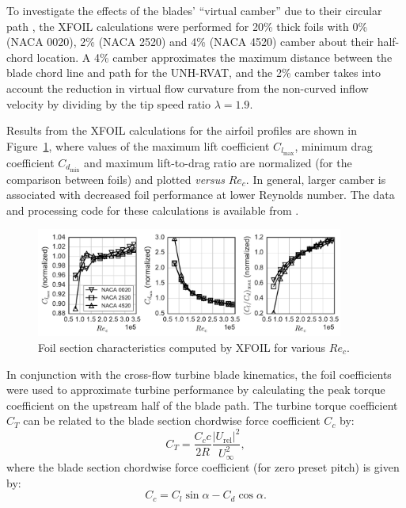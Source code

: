 \documentclass[energies,article,accept,moreauthors,pdftex,10pt,a4paper]{mdpi}
\theoremstyle{mdpi}
\newcounter{ex}
\newcounter{re}
\begin{document}
To investigate the effects of the blades' ``virtual camber'' due to their
circular path \cite{Migliore1980}, the XFOIL calculations were performed for
20\% thick foils with 0\% (NACA 0020), 2\% (NACA 2520) and 4\% (NACA 4520)
camber about their half-chord location. A 4\% camber approximates the maximum
distance between the blade chord line and path for the UNH-RVAT, and the 2\%
camber takes into account the reduction in virtual flow curvature from the
non-curved inflow velocity by dividing by the tip speed ratio $\lambda=1.9$.

Results from the XFOIL calculations for the airfoil profiles are shown in
Figure~\ref{fig:foil-Re-dep}, where values of the maximum lift coefficient
$C_{l_{\max}}$, minimum drag coefficient $C_{d_{\min}}$ and maximum
lift-to-drag ratio are normalized (for the comparison between foils) and plotted
\textit{versus} $Re_c$. In general, larger camber is associated with decreased foil
performance at lower Reynolds number. The data and processing code for these
calculations is available from \cite{Bachant2015-NACAXX20-XFOIL}.

\begin{figure}[H]
\centering
\includegraphics[width=0.9\textwidth]{figures/all_foils_re_dep}
\caption{Foil section characteristics computed by XFOIL for various $Re_c$.}
\label{fig:foil-Re-dep}
\end{figure}


In conjunction with the cross-flow turbine blade kinematics, the foil
coefficients were used to approximate turbine performance by calculating the
peak torque coefficient on the upstream half of the blade path. The turbine
torque coefficient $C_T$ can be related to the blade section chordwise force
coefficient $C_c$ by:
\begin{equation}
C_T = \frac{C_c c}{2R} \frac{|U_\mathrm{rel}|^2}{U_\infty^2},
\label{eq:ct}
\end{equation}
where the blade section chordwise force coefficient (for zero preset pitch) is
given by:
\begin{equation}
C_c = C_l \sin \alpha - C_d \cos \alpha.
\label{eq:cc}
\end{equation}
\end{document}
